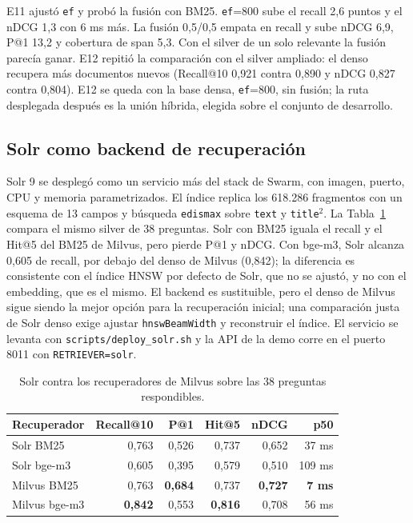 E11 ajust\'o \texttt{ef} y prob\'o la fusi\'on con BM25. \texttt{ef}=800 sube el recall 2,6 puntos y el nDCG 1,3 con 6 ms m\'as. La fusi\'on 0,5/0,5 empata en recall y sube nDCG 6,9, P@1 13,2 y cobertura de span 5,3. Con el silver de un solo relevante la fusi\'on parec\'ia ganar. E12 repiti\'o la comparaci\'on con el silver ampliado: el denso recupera m\'as documentos nuevos (Recall@10 0,921 contra 0,890 y nDCG 0,827 contra 0,804). E12 se queda con la base densa, \texttt{ef}=800, sin fusi\'on; la ruta desplegada despu\'es es la uni\'on h\'ibrida, elegida sobre el conjunto de desarrollo.

\subsection{Solr como backend de recuperaci\'on}

Solr 9 se despleg\'o como un servicio m\'as del stack de Swarm, con imagen, puerto, CPU y memoria parametrizados. El \'indice replica los 618.286 fragmentos con un esquema de 13 campos y b\'usqueda \texttt{edismax} sobre \texttt{text} y \texttt{title}$^2$. La Tabla~\ref{tab:solr} compara el mismo silver de 38 preguntas. Solr con BM25 iguala el recall y el Hit@5 del BM25 de Milvus, pero pierde P@1 y nDCG. Con bge-m3, Solr alcanza 0,605 de recall, por debajo del denso de Milvus (0,842); la diferencia es consistente con el \'indice HNSW por defecto de Solr, que no se ajust\'o, y no con el embedding, que es el mismo. El backend es sustituible, pero el denso de Milvus sigue siendo la mejor opci\'on para la recuperaci\'on inicial; una comparaci\'on justa de Solr denso exige ajustar \texttt{hnswBeamWidth} y reconstruir el \'indice. El servicio se levanta con \texttt{scripts/deploy\_solr.sh} y la API de la demo corre en el puerto 8011 con \texttt{RETRIEVER=solr}.

\begin{table}[t]
\centering
\footnotesize
\setlength{\tabcolsep}{3pt}
\caption{Solr contra los recuperadores de Milvus sobre las 38 preguntas respondibles.}
\label{tab:solr}
\begin{tabular}{lrrrrr}
\toprule
Recuperador & Recall@10 & P@1 & Hit@5 & nDCG & p50 \\
\midrule
Solr BM25 & 0,763 & 0,526 & 0,737 & 0,652 & 37 ms \\
Solr bge-m3 & 0,605 & 0,395 & 0,579 & 0,510 & 109 ms \\
Milvus BM25 & 0,763 & \textbf{0,684} & 0,737 & \textbf{0,727} & \textbf{7 ms} \\
Milvus bge-m3 & \textbf{0,842} & 0,553 & \textbf{0,816} & 0,708 & 56 ms \\
\bottomrule
\end{tabular}
\end{table}


